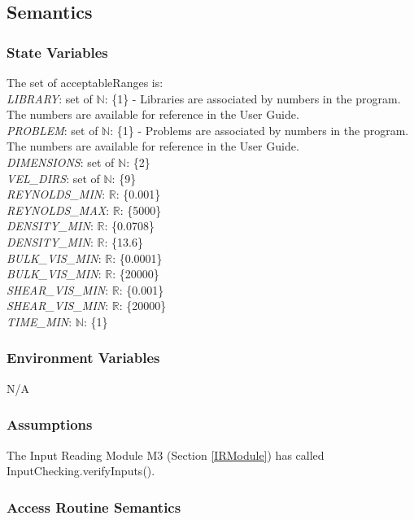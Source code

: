 \documentclass[12pt, titlepage]{article}
\begin{document}
\subsection{Semantics}

\subsubsection{State Variables}
The set of acceptableRanges is:\\
\textit{LIBRARY}: set of $\mathbb{N}$: \{1\} - Libraries are associated by numbers in the program. The numbers are available for reference in the User Guide.\\
\textit{PROBLEM}: set of $\mathbb{N}$: \{1\} - Problems are associated by numbers in the program. The numbers are available for reference in the User Guide.\\
\textit{DIMENSIONS}: set of $\mathbb{N}$: \{2\}\\
\textit{VEL\_DIRS}: set of $\mathbb{N}$: \{9\}\\
\textit{REYNOLDS\_MIN}: $\mathbb{R}$: \{0.001\}\\
\textit{REYNOLDS\_MAX}: $\mathbb{R}$: \{5000\}\\
\textit{DENSITY\_MIN}: $\mathbb{R}$: \{0.0708\}\\
\textit{DENSITY\_MIN}: $\mathbb{R}$: \{13.6\}\\
\textit{BULK\_VIS\_MIN}: $\mathbb{R}$: \{0.0001\}\\
\textit{BULK\_VIS\_MIN}: $\mathbb{R}$: \{20000\}\\
\textit{SHEAR\_VIS\_MIN}: $\mathbb{R}$: \{0.001\}\\
\textit{SHEAR\_VIS\_MIN}: $\mathbb{R}$: \{20000\}\\
\textit{TIME\_MIN}: $\mathbb{N}$: \{1\}\\

\subsubsection{Environment Variables}
N/A

\subsubsection{Assumptions}

The Input Reading Module M3 (Section \ref{IRModule}) has called InputChecking.verifyInputs().

\subsubsection{Access Routine Semantics}
\end{document}
